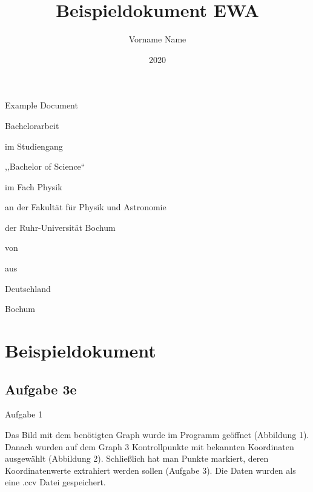 \documentclass[11pt,
               a4paper,
               parskip=half, style=authoryear, citestyle=authoryear-comp
              bibliography=totoc,
               ]{scrartcl}
\title{Beispieldokument EWA} %
\author{Vorname Name} %
\date{2020} %
\newcommand{\theothertitle}{Example Document} %
\newcommand{\bachelormaster}{Bachelor} %
\newcommand{\sciencearts}{Science} %
\newcommand{\placeofbirth}{Deutschland} %
\newcommand{\location}{Bochum}
\begin{document}
\begin{titlepage}
  \centering
  {\huge\titlefont\thetitle\par
                  \bigskip\bigskip
                  \theothertitle\par}
  \vspace{2cm}

  \begin{spacing}{0.8}
    {\LARGE \bachelormaster arbeit\par
            \bigskip\medskip
            im Studiengang\par
            ,,\bachelormaster{} of \sciencearts``\par
            im Fach Physik\par
            \bigskip\medskip
            an der Fakultät für Physik und Astronomie\par
            der Ruhr-Universität Bochum\par}

    \vfill

    {\LARGE von\par
            \theauthor\par
            \bigskip\medskip
            aus\par
            \placeofbirth\par}
  \end{spacing}

  \vspace{1.8cm}

  {\LARGE \location{} \thedate\par}
\end{titlepage}
\restoregeometry
\cleardoublepage

\tableofcontents
\cleardoublepage

\section{Beispieldokument}

\subsection{Aufgabe 3e}

Aufgabe 1

Das Bild mit dem benötigten Graph wurde im Programm geöffnet (Abbildung 1). Danach wurden auf dem Graph 3 Kontrollpunkte mit bekannten Koordinaten ausgewählt (Abbildung 2). Schließlich hat man Punkte markiert, deren Koordinatenwerte extrahiert werden sollen (Aufgabe 3). Die Daten wurden als eine .ccv Datei gespeichert.
\end{document}
